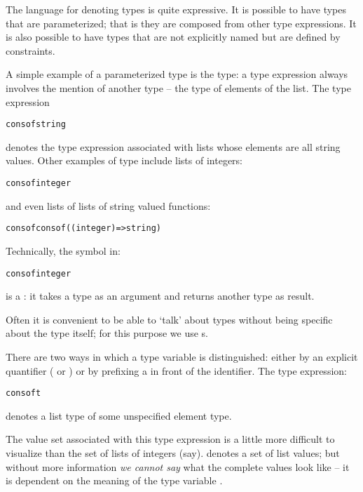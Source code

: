 The language for denoting types is quite expressive. It is possible to have types that are parameterized; that is they are composed from other type expressions. It is also possible to have types that are not explicitly named but are defined by constraints.

A simple example of a parameterized type is the  type: a  type expression always involves the mention of another type -- the type of elements of the list. The type expression
\begin{alltt}
cons of string
\end{alltt}
denotes the type expression associated with lists whose elements are all string values. Other examples of  type include lists of integers:
\begin{alltt}
cons of integer
\end{alltt}
and even lists of lists of string valued functions:
\begin{alltt}
cons of cons of ((integer)=>string)
\end{alltt}
\noindent\begin{aside}
Technically, the  symbol in:
\begin{alltt}
cons of integer
\end{alltt}
is a : it takes a type as an argument and returns another type as result.
\end{aside}
Often it is convenient to be able to `talk' about types without being specific about the type itself; for this purpose we use s.

There are two ways in which a type variable is distinguished: either by an explicit quantifier ( or ) or by prefixing a \q{\pcent{}} in front of the identifier. The type expression:
\begin{alltt}
cons of \pcent{}t
\end{alltt}
denotes a list type of some unspecified element type.

\begin{aside}
The value set associated with this type expression is a little more difficult to visualize than the set of lists of integers (say).  denotes a set of list values; but without more information \emph{we cannot say} what the complete values look like -- it is dependent on the meaning of the type variable .
\end{aside}

